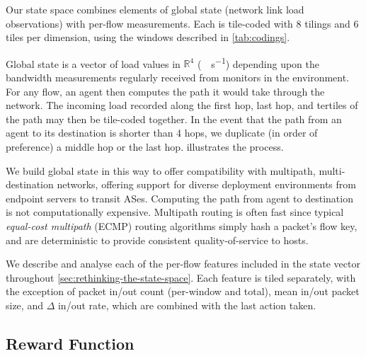 \documentclass[10pt, times, comsoc]{IEEEtran}
\begin{document}
Our state space combines elements of global state (network link load observations) with per-flow measurements.
Each is tile-coded with 8 tilings and 6 tiles per dimension, using the windows described in \cref{tab:codings}.

Global state is a vector of load values in $\mathbb{R}^4$ (\si{\mega\bit\per\second}) depending upon the bandwidth measurements regularly received from monitors in the environment.
For any flow, an agent then computes the path it would take through the network.
The incoming load recorded along the first hop, last hop, and tertiles of the path may then be tile-coded together.
In the event that the path from an agent to its destination is shorter than 4 hops, we duplicate (in order of preference) a middle hop or the last hop.
 illustrates the process.

We build global state in this way to offer compatibility with multipath, multi-destination networks, offering support for diverse deployment environments from endpoint servers to transit ASes.
Computing the path from agent to destination is not computationally expensive.
Multipath routing is often fast since typical \emph{equal-cost multipath} (ECMP) routing algorithms simply hash a packet's flow key, and are deterministic to provide consistent quality-of-service to hosts.


We describe and analyse each of the per-flow features included in the state vector throughout \cref{sec:rethinking-the-state-space}.
Each feature is tiled separately, with the exception of packet in/out count (per-window and total), mean in/out packet size, and $\Delta$ in/out rate, which are combined with the last action taken.

\subsection{Reward Function}

%
\end{document}

